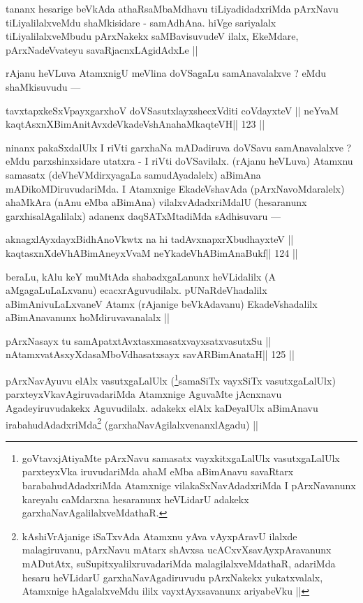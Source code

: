 \begin{artha}
tananx hesarige beVkAda athaRsaMbaMdhavu tiLiyadidadxriMda pArxNavu 
tiLiyalilalxveMdu shaMkisidare - samAdhAna. hiVge sariyalalx 
tiLiyalilalxveMbudu pArxNakekx saMBavisuvudeV ilalx, EkeMdare, pArxNadeVvateyu savaRjacnxLAgidAdxLe ||
\end{artha}

\begin{artha}
rAjanu heVLuva AtamxnigU meVlina doVSagaLu samAnavalalxve ? eMdu shaMkisuvudu ---
\end{artha} 

\begin{shl}
tavxtapxkeSxV\s payxgarxhoV doVSasutxlayxshecxVditi coVdayxteV ||
neYvaM kaqtAsxnXBimAnitAvxdeVkadeVshAnahaMkaqteVH\hfill || 123 ||
\end{shl}

\begin{artha}
ninanx pakaSxdalUlx I riVti garxhaNa mADadiruva doVSavu samAnavalalxve ? eMdu parxshinxsidare utatxra - I riVti doVSavilalx. (rAjanu heVLuva) Atamxnu samasatx (deVheVMdirxyagaLa samudAyadalelx) aBimAna mADikoMDiruvudariMda. I Atamxnige EkadeVshavAda (pArxNavoMdaralelx) ahaMkAra (nAnu eMba aBimAna) vilalxvAdadxriMdalU (hesaranunx garxhisalAgalilalx) adanenx daqSATxMtadiMda sAdhisuvaru ---
\end{artha} 

\begin{shl}
aknagxlAyxdayxBidhAnoVkwtx na hi tadAvxnapxrXbudhayxteV ||
kaqtasxnXdeVhABimAneyxVvaM neYkadeVhABimAnaBukf\hfill || 124 ||
\end{shl}

\begin{artha}
beraLu, kAlu keY muMtAda shabadxgaLanunx heVLidalilx (A aMgagaLuLaLxvanu) ecacxrAguvudilalx. pUNaRdeVhadalilx aBimAnivuLaLxvaneV Atamx (rAjanige beVkAdavanu) EkadeVshadalilx aBimAnavanunx hoMdiruvavanalalx ||
\end{artha}

\begin{shl}
pArxNasayx tu samApatxtAvxtasxmasatxvayxsatxvasutxSu ||
nA\s\s tamxvatAsxyXdasaMboVdhasatxsayx savARBimAnataH\hfill || 125 ||
\end{shl}

\begin{artha}
pArxNavAyuvu elAlx vasutxgaLalUlx (\footnote[13]{goVtavxjAtiyaMte 
pArxNavu samasatx vayxkitxgaLalUlx vasutxgaLalUlx parxteyxVka iruvudariMda ahaM eMba aBimAnavu savaRtarx barabahudAdadxriMda Atamxnige vilakaSxNavAdadxriMda I pArxNavanunx kareyalu caMdarxna hesaranunx heVLidarU adakekx garxhaNavAgalilalxveMdathaR.}samaSiTx vayxSiTx vasutxgaLalUlx) parxteyxVkavAgiruvadariMda Atamxnige AguvaMte jAcnxnavu Agadeyiruvudakekx Aguvudilalx. adakekx elAlx kaDeyalUlx aBimAnavu irabahudAdadxriMda\footnote[14]{kAshiVrAjanige iSaTxvAda Atamxnu yAva vAyxpAravU ilalxde malagiruvanu, pArxNavu mAtarx shAvxsa ucACxvXsavAyxpAravanunx mADutAtx, suSupitxyalilxruvadariMda malagilalxveMdathaR, adariMda hesaru heVLidarU garxhaNavAgadiruvudu pArxNakekx yukatxvalalx, Atamxnige hAgalalxveMdu ililx vayxtAyxsavanunx ariyabeVku ||} (garxhaNavAgilalxvenanxlAgadu) ||
\end{artha}

